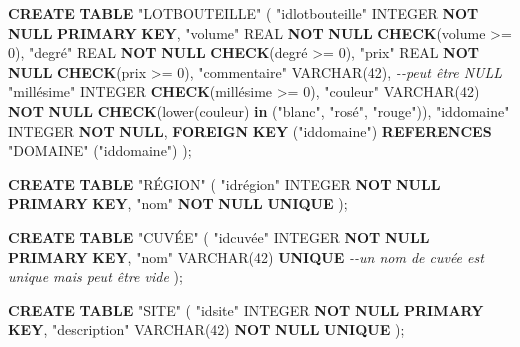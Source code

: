 \documentclass[11pt]{article}
\newenvironment{Shaded}{}{}
\newcommand{\KeywordTok}[1]{\textcolor[rgb]{0.00,0.44,0.13}{\textbf{{#1}}}}
\newcommand{\DataTypeTok}[1]{\textcolor[rgb]{0.56,0.13,0.00}{{#1}}}
\newcommand{\DecValTok}[1]{\textcolor[rgb]{0.25,0.63,0.44}{{#1}}}
\newcommand{\CommentTok}[1]{\textcolor[rgb]{0.38,0.63,0.69}{\textit{{#1}}}}
\newcommand{\OtherTok}[1]{\textcolor[rgb]{0.00,0.44,0.13}{{#1}}}
\newcommand{\FunctionTok}[1]{\textcolor[rgb]{0.02,0.16,0.49}{{#1}}}
\newcommand{\NormalTok}[1]{{#1}}
\newcommand{\OperatorTok}[1]{\textcolor[rgb]{0.40,0.40,0.40}{{#1}}}
\begin{document}
\begin{Shaded}
\begin{Highlighting}[]
\KeywordTok{CREATE} \KeywordTok{TABLE} \OtherTok{"LOTBOUTEILLE"}\NormalTok{ (}
  \OtherTok{"idlotbouteille"} \DataTypeTok{INTEGER} \KeywordTok{NOT} \KeywordTok{NULL} \KeywordTok{PRIMARY} \KeywordTok{KEY}\NormalTok{,}
  \OtherTok{"volume"} \DataTypeTok{REAL} \KeywordTok{NOT} \KeywordTok{NULL} \KeywordTok{CHECK}\NormalTok{(volume }\OperatorTok{>=} \DecValTok{0}\NormalTok{),}
  \OtherTok{"degré"} \DataTypeTok{REAL} \KeywordTok{NOT} \KeywordTok{NULL} \KeywordTok{CHECK}\NormalTok{(degré }\OperatorTok{>=} \DecValTok{0}\NormalTok{),}
  \OtherTok{"prix"} \DataTypeTok{REAL} \KeywordTok{NOT} \KeywordTok{NULL} \KeywordTok{CHECK}\NormalTok{(prix }\OperatorTok{>=} \DecValTok{0}\NormalTok{),}
  \OtherTok{"commentaire"} \DataTypeTok{VARCHAR}\NormalTok{(}\DecValTok{42}\NormalTok{),  }\CommentTok{{-}{-}peut être NULL}
  \OtherTok{"millésime"} \DataTypeTok{INTEGER} \KeywordTok{CHECK}\NormalTok{(millésime }\OperatorTok{>=} \DecValTok{0}\NormalTok{),}
  \OtherTok{"couleur"} \DataTypeTok{VARCHAR}\NormalTok{(}\DecValTok{42}\NormalTok{) }\KeywordTok{NOT} \KeywordTok{NULL} \KeywordTok{CHECK}\NormalTok{(}\FunctionTok{lower}\NormalTok{(couleur) }\KeywordTok{in}\NormalTok{ (}\OtherTok{"blanc"}\NormalTok{, }\OtherTok{"rosé"}\NormalTok{, }\OtherTok{"rouge"}\NormalTok{)),}
  \OtherTok{"iddomaine"} \DataTypeTok{INTEGER} \KeywordTok{NOT} \KeywordTok{NULL}\NormalTok{,}
  \KeywordTok{FOREIGN} \KeywordTok{KEY}\NormalTok{ (}\OtherTok{"iddomaine"}\NormalTok{) }\KeywordTok{REFERENCES} \OtherTok{"DOMAINE"}\NormalTok{ (}\OtherTok{"iddomaine"}\NormalTok{)}
\NormalTok{);}


\KeywordTok{CREATE} \KeywordTok{TABLE} \OtherTok{"RÉGION"}\NormalTok{ (}
  \OtherTok{"idrégion"}  \DataTypeTok{INTEGER} \KeywordTok{NOT} \KeywordTok{NULL} \KeywordTok{PRIMARY} \KeywordTok{KEY}\NormalTok{,}
  \OtherTok{"nom"} \KeywordTok{NOT} \KeywordTok{NULL}  \KeywordTok{UNIQUE}
\NormalTok{);}

\KeywordTok{CREATE} \KeywordTok{TABLE} \OtherTok{"CUVÉE"}\NormalTok{ (}
  \OtherTok{"idcuvée"}  \DataTypeTok{INTEGER} \KeywordTok{NOT} \KeywordTok{NULL} \KeywordTok{PRIMARY} \KeywordTok{KEY}\NormalTok{,}
  \OtherTok{"nom"} \DataTypeTok{VARCHAR}\NormalTok{(}\DecValTok{42}\NormalTok{)   }\KeywordTok{UNIQUE}                \CommentTok{{-}{-}un nom de cuvée est unique mais peut être vide}
\NormalTok{);}

\KeywordTok{CREATE} \KeywordTok{TABLE} \OtherTok{"SITE"}\NormalTok{ (}
  \OtherTok{"idsite"} \DataTypeTok{INTEGER} \KeywordTok{NOT} \KeywordTok{NULL} \KeywordTok{PRIMARY} \KeywordTok{KEY}\NormalTok{,}
  \OtherTok{"description"} \DataTypeTok{VARCHAR}\NormalTok{(}\DecValTok{42}\NormalTok{) }\KeywordTok{NOT} \KeywordTok{NULL} \KeywordTok{UNIQUE}  
\NormalTok{);}



\end{Highlighting}
\end{Shaded}
\end{document}
